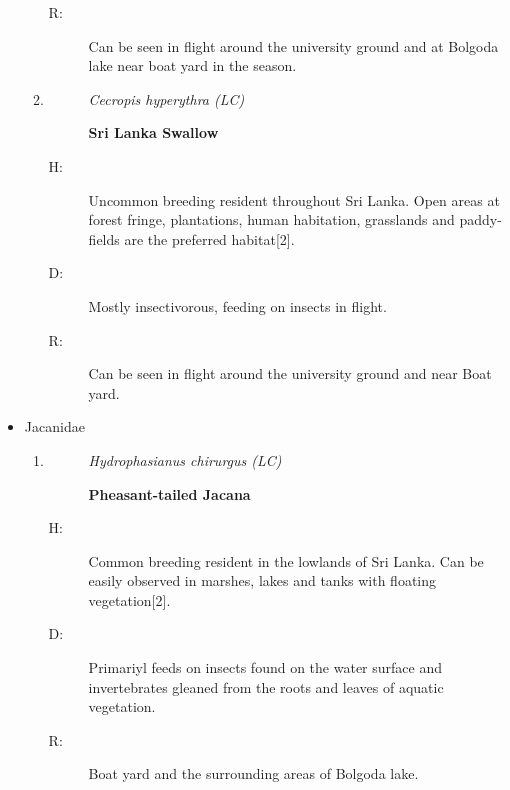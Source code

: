\begin{itemize}
\begin{enumerate}
\begin{description}
\item[R: ]%
Can be seen in flight around the university ground and at Bolgoda lake near boat yard in the season.%
\end{description}%
\item%
\begin{description}%
\item[]%
\textit{Cecropis hyperythra (LC)}%
\item[]%
\textbf{Sri Lanka Swallow}%
\end{description}%
\begin{description}%
\item[H: ]%
Uncommon breeding resident throughout Sri Lanka. Open areas at forest fringe, plantations, human habitation, grasslands and paddy-fields are the preferred habitat{[}2{]}.%
\item[D: ]%
Mostly insectivorous, feeding on insects in flight.%
\item[R: ]%
Can be seen in flight around the university ground and near Boat yard.%
\end{description}%
\end{enumerate}%
\item%
Jacanidae%
\begin{enumerate}%
\item%
\begin{description}%
\item[]%
\textit{Hydrophasianus chirurgus (LC)}%
\item[]%
\textbf{Pheasant{-}tailed Jacana}%
\end{description}%
\begin{description}%
\item[H: ]%
Common breeding resident in the lowlands of Sri Lanka. Can be easily observed in marshes, lakes and tanks with floating vegetation{[}2{]}.%
\item[D: ]%
Primariyl feeds on insects found on the water surface and invertebrates gleaned from the roots and leaves of aquatic vegetation.%
\item[R: ]%
Boat yard and the surrounding areas of Bolgoda lake.\newline
\newline\newline\newline%
\end{description}%
\end{enumerate}%
\begin{figure}[!htpb]
    \centering

\end{figure}
\end{itemize}
